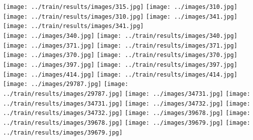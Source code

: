 \documentclass{beamer}
\begin{document}
\begin{frame}
\texttt{[image: ../train/results/images/315.jpg]}
\texttt{[image: ../images/310.jpg]}
\texttt{[image: ../train/results/images/310.jpg]}
\texttt{[image: ../images/341.jpg]}
\texttt{[image: ../train/results/images/341.jpg]}\\
\texttt{[image: ../images/340.jpg]}
\texttt{[image: ../train/results/images/340.jpg]}
\texttt{[image: ../images/371.jpg]}
\texttt{[image: ../train/results/images/371.jpg]}
\texttt{[image: ../images/370.jpg]}
\texttt{[image: ../train/results/images/370.jpg]}
\texttt{[image: ../images/397.jpg]}
\texttt{[image: ../train/results/images/397.jpg]}
\texttt{[image: ../images/414.jpg]}
\texttt{[image: ../train/results/images/414.jpg]}\\
\texttt{[image: ../images/29787.jpg]}
\texttt{[image: ../train/results/images/29787.jpg]}
\texttt{[image: ../images/34731.jpg]}
\texttt{[image: ../train/results/images/34731.jpg]}
\texttt{[image: ../images/34732.jpg]}
\texttt{[image: ../train/results/images/34732.jpg]}
\texttt{[image: ../images/39678.jpg]}
\texttt{[image: ../train/results/images/39678.jpg]}
\texttt{[image: ../images/39679.jpg]}
\texttt{[image: ../train/results/images/39679.jpg]}
\end{frame}
\end{document}

